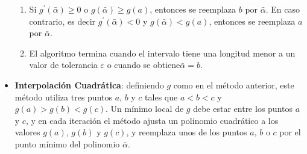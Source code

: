 \begin{itemize}
\begin{enumerate}
		\item Si \(g^{\prime}(\bar{\alpha}) \geq 0\) o \(g(\bar{\alpha}) \geq g(a)\), entonces se reemplaza \(b\) por \(\bar{\alpha}\). En caso contrario, es decir \(g^{\prime}(\bar{\alpha}) < 0\) y \(g(\bar{\alpha}) < g(a)\), entonces se reemplaza \(a\) por \(\bar{\alpha}\).
		
		\item El algoritmo termina cuando el intervalo tiene una longitud menor a un valor de tolerancia \(\varepsilon\) o cuando se obtiene\(\bar{\alpha} = b\).
	\end{enumerate}
	
	\item \textbf{Interpolación Cuadrática}: definiendo \(g\) como en el método anterior, este método utiliza tres puntos \(a\), \(b\) y \(c\) tales que \(a < b < c\) y \(g(a) > g(b) < g(c)\). Un mínimo local de \(g\) debe estar entre los puntos \(a\) y \(c\), y en cada iteración el método ajusta un polinomio cuadrático a los valores \(g(a)\), \(g(b)\) y \(g(c)\), y reemplaza unos de los puntos \(a\), \(b\) o \(c\) por el punto mínimo del polinomio \(\bar{\alpha}\).
	

\end{itemize}
